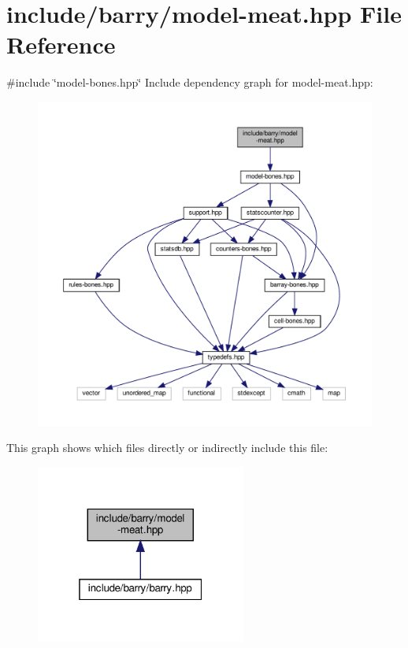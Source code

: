 \hypertarget{model-meat_8hpp}{}\section{include/barry/model-\/meat.hpp File Reference}
\label{model-meat_8hpp}
{\ttfamily \#include \char`\"{}model-\/bones.\+hpp\char`\"{}}\newline
Include dependency graph for model-\/meat.hpp\+:
\nopagebreak
\begin{figure}[H]
\begin{center}
\leavevmode
\includegraphics[width=350pt]{model-meat_8hpp__incl}
\end{center}
\end{figure}
This graph shows which files directly or indirectly include this file\+:
\nopagebreak
\begin{figure}[H]
\begin{center}
\leavevmode
\includegraphics[width=196pt]{model-meat_8hpp__dep__incl}
\end{center}
\end{figure}
